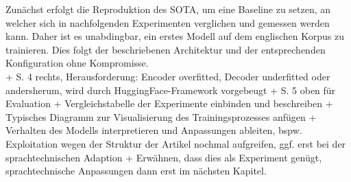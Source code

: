 \noindent
Zunächst erfolgt die Reproduktion des \ac{SOTA}, um eine Baseline zu setzen, an welcher sich in nachfolgenden Experimenten verglichen und gemessen werden kann. Daher ist es unabdingbar, ein erstes Modell auf dem englischen Korpus zu trainieren. Dies folgt der beschriebenen Architektur und der entsprechenden Konfiguration ohne Kompromisse.\\


\noindent
+ \cite{YAN19} S. 4 rechts, Herausforderung: Encoder overfitted, Decoder underfitted oder andersherum, wird durch HuggingFace-Framework vorgebeugt
+ \cite{YAN19} S. 5 oben für Evaluation
+ Vergleichstabelle der Experimente einbinden und beschreiben
+ Typisches Diagramm zur Visualisierung des Trainingsprozesses anfügen
+ Verhalten des Modells interpretieren und Anpassungen ableiten, bspw. Exploitation wegen der Struktur der Artikel nochmal aufgreifen, ggf. erst bei der sprachtechnischen Adaption
+ Erwähnen, dass dies als Experiment genügt, sprachtechnische Anpassungen dann erst im nächsten Kapitel.\\
